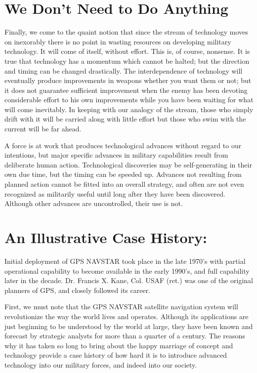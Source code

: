 \section{We Don't Need to Do Anything}
Finally, we come to the quaint notion that since the stream of technology moves on inexorably there is no point in wasting resources on developing military technology. It will come of itself, without effort. This is, of course, nonsense. It is true that technology has a momentum which cannot be halted; but the direction and timing can be changed drastically. The interdependence of technology will eventually produce improvements in weapons whether you want them or not; but it does not guarantee sufficient improvement when the enemy has been devoting considerable effort to his own improvements while you have been waiting for what will come inevitably. In keeping with our analogy of the stream, those who simply drift with it will be carried along with little effort but those who swim with the current will be far ahead.

A force is at work that produces technological advances without regard to our intentions, but major specific advances in military capabilities result from deliberate human action. Technological discoveries may be self-generating in their own due time, but the timing can be speeded up. Advances not resulting from planned action cannot be fitted into an overall strategy, and often are not even recognized as militarily useful until long after they have been discovered. Although other advances are uncontrolled, their use is not.

\section{An Illustrative Case History:}
Initial deployment of GPS NAVSTAR took place in the late 1970's with partial operational capability to become available in the early 1990's, and full capability later in the decade. Dr. Francis X. Kane, Col. USAF (ret.) was one of the original planners of GPS, and closely followed its career.

First, we must note that the GPS NAVSTAR satellite navigation system will revolutionize the way the world lives and operates. Although its applications are just beginning to be understood by the world at large, they have been known and forecast by strategic analysts for more than a quarter of a century. The reasons why it has taken so long to bring about the happy marriage of concept and technology provide a case history of how hard it is to introduce advanced technology into our military forces, and indeed into our society.

